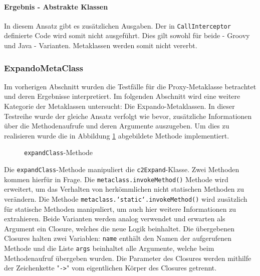 

\paragraph{Ergebnis - Abstrakte Klassen}

In diesem Ansatz gibt es zusätzlichen Ausgaben.
Der in \texttt{CallInterceptor} definierte Code wird somit nicht ausgeführt.
Dies gilt sowohl für beide - Groovy und Java - Varianten.
Metaklassen werden somit nicht vererbt.




\subsubsection{ExpandoMetaClass}
Im vorherigen Abschnitt wurden die Testfälle für die Proxy-Metaklasse betrachtet und deren Ergebnisse interpretiert. 
Im folgenden Abschnitt wird eine weitere Kategorie der Metaklassen untersucht: Die Expando-Metaklassen. 
In dieser Testreihe wurde der gleiche Ansatz verfolgt wie bevor, zusätzliche Informationen über die Methodenaufrufe und deren Argumente auszugeben. 
Um dies zu realisieren wurde die in Abbildung \ref{fig:MetaTester-expandClass} abgebildete Methode implementiert.


\begin{figure}[hbt!]
	
	\caption{\texttt{expandClass}-Methode}
	\label{fig:MetaTester-expandClass}
\end{figure}


Die \texttt{expandClass}-Methode manipuliert die \texttt{c2Expand}-Klasse. 
Zwei Methoden kommen hierfür in Frage. 
Die \texttt{metaclass.invokeMethod()} Methode wird erweitert, um das Verhalten von herkömmlichen nicht statischen Methoden zu verändern. 
Die Methode \texttt{metaclass.‘static‘.invokeMethod()} wird zusätzlich für statische Methoden manipuliert, um auch hier weitere Informationen zu extrahieren. 
Beide Varianten werden analog verwendet und erwarten als Argument ein Closure, welches die neue Logik beinhaltet. 
Die übergebenen Closures halten zwei Variablen: \texttt{name} enthält den Namen der aufgerufenen Methode und die Liste \texttt{args} beinhaltet alle Argumente, welche beim Methodenaufruf übergeben wurden. 
Die Parameter des Closures werden mithilfe der Zeichenkette "\texttt{->}" vom eigentlichen Körper des Closures getrennt. 


